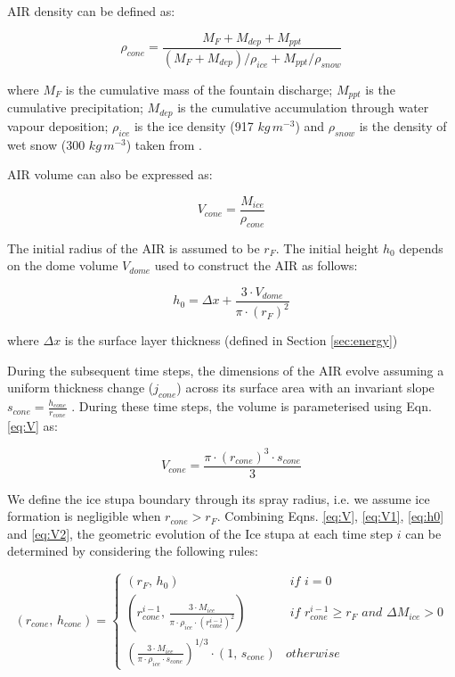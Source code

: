 AIR density can be defined as:

\begin{equation}
	\rho_{cone} = \frac{M_{F} + M_{dep} + M_{ppt}}{(M_{F} + M_{dep})/\rho_{ice} + M_{ppt}/\rho_{snow}}
\end{equation}

where $M_F$ is the cumulative mass of the fountain discharge; $M_{ppt}$ is the cumulative precipitation;
$M_{dep}$ is the cumulative accumulation through water vapour deposition; $\rho_{ice}$ is the ice density (917
$kg\,m^{-3}$) and $\rho_{snow}$ is the density of wet snow (300 $kg\,m^{-3}$) taken from
\cite{cuffeyPhysicsGlaciers2010} .

AIR volume can also be expressed as:

\begin{equation} V_{cone} =\frac{M_{ice}} {\rho_{cone}} \label{eq:V1} \end{equation}

The initial radius of the AIR is assumed to be $r_F$. The initial height $h_0$ depends on the dome volume
$V_{dome}$ used to construct the AIR as follows:

\begin{equation}
	h_{0} =  \Delta x + \frac{3 \cdot V_{dome}}{\pi \cdot (r_F)^2 }
	\label{eq:h0}
\end{equation}

where $\Delta x$ is the surface layer thickness (defined in Section \ref{sec:energy})

During the subsequent time steps, the dimensions of the AIR evolve assuming a uniform thickness change ($j_{cone}$)
across its surface area with an invariant slope $s_{cone} = \frac{h_{cone}}{r_{cone}}$ .  During these time
steps, the volume is parameterised using Eqn. \ref{eq:V} as:

\begin{equation} V_{cone} = \frac{\pi \cdot {(r_{cone})}^3
		\cdot s_{cone}}{3} \label{eq:V2} \end{equation}

We define the ice stupa boundary through its spray radius, i.e. we assume ice formation is negligible when $r_{cone} >
	r_{F}$. Combining Eqns. \ref{eq:V},  \ref{eq:V1}, \ref{eq:h0} and \ref{eq:V2}, the geometric evolution of the
Ice stupa at each time step $i$ can be determined by considering the following rules:

\begin{equation} (r_{cone},\, h_{cone}) = \left\{ \begin{array}{ll} (r_F ,\, h_0)                                                                          & \textit{ if } i=0 \\
             (r_{cone}^{i-1},\, \frac{3 \cdot M_{ice}}{\pi \cdot \rho_{ice} \cdot {(r_{cone}^{i-1})}^2}) & \textit{ if }
             r_{cone}^{i-1} \geq r_{F} \textit{ and } \Delta M_{ice} > 0                                                     \\ (\frac{3 \cdot M_{ice}}{\pi \cdot \rho_{ice} \cdot s_{cone}})^{1/3} \cdot (1,\,  s_{cone}) &
             otherwise\end{array} \right.  \label{eq:A2} \end{equation}


